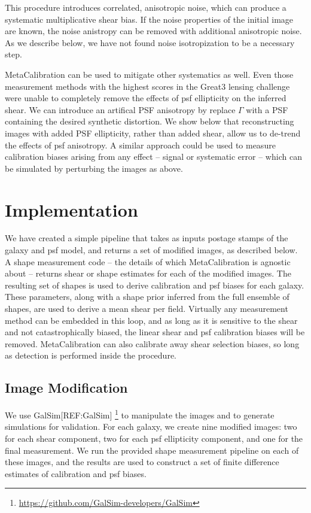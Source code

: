 \documentclass[iop]{emulateapj}
\begin{document}
This procedure introduces correlated, anisotropic noise, which can produce a systematic multiplicative shear bias. If the noise properties of the initial image are known, the noise anistropy can be removed with additional anisotropic noise. As we describe below, we have not found noise isotropization to be a necessary step.

MetaCalibration can be used to mitigate other systematics as well. Even those measurement methods with the highest scores in the Great3 lensing challenge were unable to completely remove the effects of psf ellipticity on the inferred shear. We can introduce an artifical PSF anisotropy by replace $\Gamma$ with a PSF containing the desired synthetic distortion.  We show below that reconstructing images with added PSF ellipticity, rather than added shear, allow us to de-trend the effects of psf anisotropy. A similar approach could be used to measure calibration biases arising from any effect -- signal or systematic error --  which can be simulated by perturbing the images as above.

\section{Implementation}
We have created a simple pipeline that takes as inputs postage stamps of the galaxy and psf model, and returns a set of modified images, as described below. A shape measurement code -- the details of which MetaCalibration is agnostic about -- returns shear or shape estimates for each of the modified images. The resulting set of shapes is used to derive calibration and psf biases for each galaxy. These parameters, along with a shape prior inferred from the full ensemble of shapes, are used to derive a mean shear per field. Virtually any measurement method can be embedded in this loop, and as long as it is sensitive to the shear and not catastrophically biased, the linear shear and psf calibration biases will be removed. MetaCalibration can also calibrate away shear selection biases, so long as detection is performed inside the procedure.

\subsection{Image Modification}
We use GalSim[REF:GalSim] \footnote{\url{https://github.com/GalSim-developers/GalSim}} to manipulate the images and to generate simulations for validation. For each galaxy, we create nine modified images: two for each shear component, two for each psf ellipticity component, and one for the final measurement. We run the provided shape measurement pipeline on each of these images, and the results are used to construct a set of finite difference estimates of calibration and psf biases.
\end{document}
